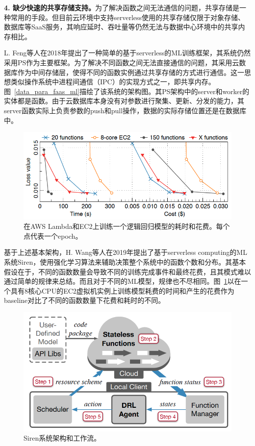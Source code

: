 \textbf{4. 缺少快速的共享存储支持。}为了解决函数之间无法通信的问题，共享存储是一种常用的手段。但目前云环境中支持serverless使用的共享存储仅限于对象存储、数据库等SaaS服务，其响应延时、吞吐量等仍然无法与数据中心环境中的共享内存相比。

L. Feng等人\parencite{feng2018exploring}在2018年提出了一种简单的基于serverless的ML训练框架，其系统仍然采用PS作为主要框架。为了解决不同函数之间无法直接通信的问题，其采用云数据库作为中间存储层，使得不同的函数实例通过共享存储的方式进行通信。这一思想类似操作系统中进程间通信（IPC）的实现方式之一，即共享内存。图~\ref{data_para_faas_ml}描绘了该系统的架构图。其PS架构中的server和worker的实体都是函数。由于云数据库本身没有对参数进行聚集、更新、分发的能力，其server函数实际上负责参数的push和pull操作，数据的实际存储位置还是在数据库中。

\begin{figure}[h]
    \centerline{\includegraphics[width=\textwidth]{figures/ec2-lambda-diff.png}}
    \caption{在AWS Lambda和EC2上训练一个逻辑回归模型的耗时和花费。每个点代表一个epoch。}
    \label{ec2_lambda_diff}
\end{figure}

基于上述基本架构，H. Wang等人\parencite{wang2019distributed}在2019年提出了基于serverless computing的ML系统Siren，使用强化学习算法来辅助决策整个系统中的函数个数和分布。其基本假设在于，不同的函数数量会导致不同的训练完成事件和最终花费，且其模式难以通过简单的规律来总结。而且对于不同的ML模型，规律也不尽相同。图~\ref{ec2_lambda_diff}以在一个具有8核心CPU的EC2虚拟机实例上训练模型耗费的时间和产生的花费作为baseline对比了不同的函数数量下花费和耗时的不同。

\begin{figure}[h]
    \centerline{\includegraphics[width=\textwidth]{figures/siren-arch.png}}
    \caption{Siren系统架构和工作流。}
    \label{siren_arch}
\end{figure}

